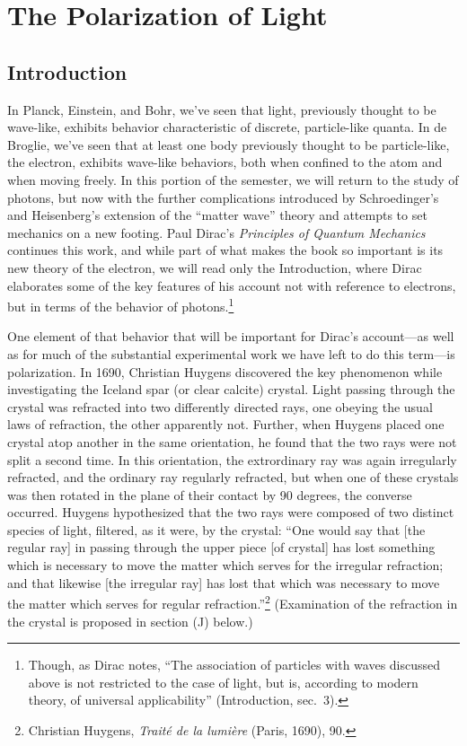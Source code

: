 \chapter{The Polarization of Light}



\section*{Introduction}

In Planck, Einstein, and Bohr, we’ve seen that light, previously thought to be wave-like, exhibits behavior characteristic of discrete, particle-like quanta. In de Broglie, we’ve seen that at least one body previously thought to be particle-like, the electron, exhibits wave-like behaviors, both when confined to the atom and when moving freely. In this portion of the semester, we will return to the study of photons, but now with the further complications introduced by Schroedinger’s and Heisenberg’s extension of the “matter wave” theory and attempts to set mechanics on a new footing. Paul Dirac’s \emph{Principles of Quantum Mechanics} continues this work, and while part of what makes the book so important is its new theory of the electron, we will read only the Introduction, where Dirac
elaborates some of the key features of his account not with reference to electrons, but in terms of the behavior of photons.\footnote{Though, as Dirac notes, ``The association of particles with waves discussed above is not
	restricted to the case of light, but is, according to modern theory, of universal applicability'' (Introduction, 
	sec.\ 3).}

One element of that behavior that will be important for Dirac’s account---as well as for much of the substantial 
experimental work we have left to do this term---is polarization. In 1690, Christian Huygens discovered 
the key phenomenon while investigating the Iceland spar (or clear calcite) crystal. Light passing through the
crystal was refracted into two differently directed rays, one obeying the usual laws of refraction, the other apparently not. 
Further, when Huygens placed one crystal atop another in the same orientation, he found that the two rays were not split a second time. In this orientation, the extrordinary ray was again irregularly refracted, and the ordinary ray regularly refracted, but when one of these crystals was then rotated in the plane of their contact by 90 degrees, the converse occurred. Huygens hypothesized that the two rays were composed of two distinct species of light, filtered, as it were, by the crystal: ``One would say that [the regular ray] in passing through the upper piece [of crystal] has lost something which is necessary to move the matter which serves for the irregular refraction; and that likewise [the irregular ray] has lost that which was necessary to move the matter which serves for regular refraction.''\footnote{Christian Huygens, \emph{Trait\'e de la lumi\`ere} (Paris, 1690), 90.} (Examination of the refraction in the crystal is proposed in section (J) below.)

